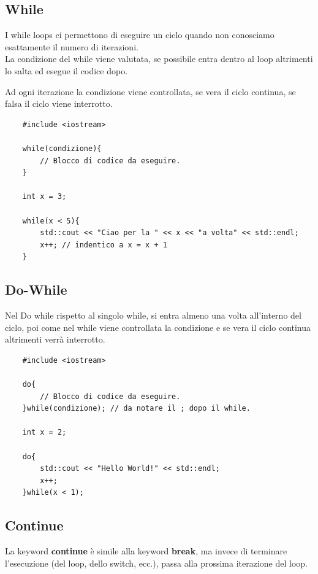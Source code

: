 \subsection{While}

\textsf{\small I while loops ci permettono di eseguire un ciclo quando non conosciamo esattamente il numero di iterazioni. } \\

\textsf{\small La condizione del while viene valutata, se possibile entra dentro al loop altrimenti lo salta ed esegue il codice dopo.}

\textsf{\small Ad ogni iterazione la condizione viene controllata, se vera il ciclo continua, se falsa il ciclo viene interrotto.} \\

\begin{lstlisting}
	#include <iostream>
	
	while(condizione){
		// Blocco di codice da eseguire.
	}

	int x = 3;
	
	while(x < 5){
		std::cout << "Ciao per la " << x << "a volta" << std::endl;
		x++; // indentico a x = x + 1
	}
\end{lstlisting}

\subsection{Do-While}

\textsf{\small Nel Do while rispetto al singolo while, si entra almeno una volta all'interno del ciclo, poi come nel while viene controllata la condizione e se vera il ciclo continua altrimenti verrà interrotto.} \\

\begin{lstlisting}
	#include <iostream>
	
	do{
		// Blocco di codice da eseguire.
	}while(condizione); // da notare il ; dopo il while.

	int x = 2;
	
	do{
		std::cout << "Hello World!" << std::endl;
		x++;
	}while(x < 1);
\end{lstlisting}

\subsection{Continue}

\textsf{\small La keyword \textbf{continue} è simile alla keyword \textbf{break}, ma invece di terminare l'esecuzione (del loop, dello switch, ecc.), passa alla prossima iterazione del loop.}\\

